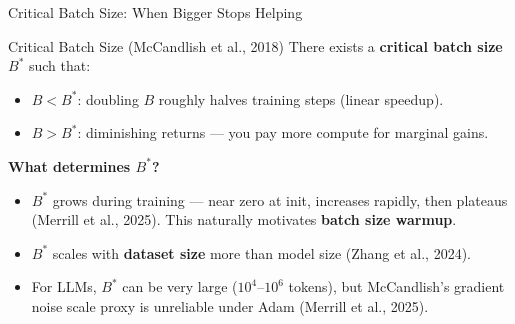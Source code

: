 \documentclass[aspectratio=169, 10pt]{beamer}
\newcommand{\keyword}[1]{\textcolor{ColumbiaBlue}{\textbf{#1}}}
\newcommand{\good}[1]{\textcolor{GoodGreen!80!black}{#1}}
\begin{document}
\begin{frame}{Critical Batch Size: When Bigger Stops Helping}

\begin{block}{Critical Batch Size (McCandlish et al., 2018)}
There exists a \keyword{critical batch size} $B^*$ such that:
\begin{itemize}
  \item $B < B^*$: doubling $B$ roughly halves training steps (linear speedup).
  \item $B > B^*$: diminishing returns --- you pay more compute for marginal gains.
\end{itemize}
\end{block}

\vspace{4pt}
\textbf{What determines $B^*$?}
\begin{itemize}
  \item $B^*$ \good{grows during training} --- near zero at init, increases rapidly, then plateaus (Merrill et al., 2025). This naturally motivates \keyword{batch size warmup}.
  \item $B^*$ scales with \textbf{dataset size} more than model size (Zhang et al., 2024).
  \item For LLMs, $B^*$ can be very large ($10^4$--$10^6$ tokens), but McCandlish's gradient noise scale proxy is unreliable under Adam (Merrill et al., 2025).
\end{itemize}

\vspace{4pt}

\end{frame}
\end{document}
